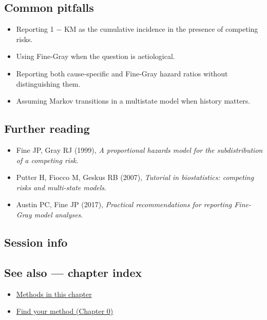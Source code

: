\documentclass[
]{article}
\newenvironment{Shaded}{\begin{snugshade}}{\end{snugshade}}
\providecommand{\tightlist}{%
  \setlength{\itemsep}{0pt}\setlength{\parskip}{0pt}}
\begin{document}
\subsection{Common pitfalls}\label{common-pitfalls}

\begin{itemize}
\tightlist
\item
  Reporting 1 − KM as the cumulative incidence in the presence of
  competing risks.
\item
  Using Fine-Gray when the question is aetiological.
\item
  Reporting both cause-specific and Fine-Gray hazard ratios without
  distinguishing them.
\item
  Assuming Markov transitions in a multistate model when history
  matters.
\end{itemize}

\subsection{Further reading}\label{further-reading}

\begin{itemize}
\tightlist
\item
  Fine JP, Gray RJ (1999), \emph{A proportional hazards model for the
  subdistribution of a competing risk}.
\item
  Putter H, Fiocco M, Geskus RB (2007), \emph{Tutorial in biostatistics:
  competing risks and multi-state models}.
\item
  Austin PC, Fine JP (2017), \emph{Practical recommendations for
  reporting Fine-Gray model analyses}.
\end{itemize}

\subsection{Session info}\label{session-info}

\begin{Shaded}
\begin{Highlighting}[]

\end{Highlighting}
\end{Shaded}

\subsection{See also --- chapter index}\label{see-also-chapter-index}

\begin{itemize}
\tightlist
\item
  \href{../index.Rmd}{Methods in this chapter}
\item
  \href{../../../ch00-find-your-method.Rmd}{Find your method (Chapter
  0)}
\end{itemize}
\end{document}

